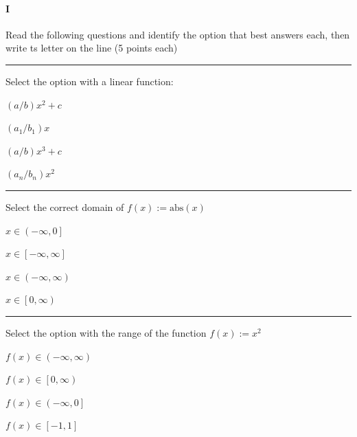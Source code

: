 
\paragraph{I} Read the following questions and identify the option that best answers each, then write ts letter on the line (5 points each)

\begin{preguntas}

\pregunta[5] \rule{1cm}{0.1mm} Select the option with a linear function:

\begin{enumerate*}[label=(\alph*)]
    \item $(a/b)x^2 + c\qquad$
    \item $(a_1/b_1)x \qquad$
    \item $(a/b)x^3 + c\qquad$
    \item $(a_n/b_n)x^2\qquad$
\end{enumerate*}

\pregunta[5] \rule{1cm}{0.1mm} Select the correct domain of $f(x):=\mathrm{abs}(x)$

\begin{enumerate*}[label=(\alph*)]
    \item $x\in\left(-\infty,0\right]\qquad$
    \item $x\in\left[-\infty,\infty\right]\qquad$
    \item $x\in\left(-\infty,\infty\right)\qquad$
    \item $x\in\left[0,\infty\right)\qquad$
\end{enumerate*}

\pregunta[5] \rule{1cm}{0.1mm} Select the option with the range of the function $f(x):=x^2$

\begin{enumerate*}[label=(\alph*)]
    \item $f(x)\in\left(-\infty,\infty\right)\qquad$
    \item $f(x)\in\left[0,\infty\right)\qquad$
    \item $f(x)\in\left(-\infty,0\right]\qquad$
    \item $f(x)\in\left[-1,1\right]\qquad$
\end{enumerate*}


\end{preguntas}
